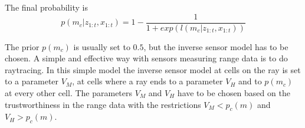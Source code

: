 The final probability is 
\begin{equation} \label{eq4_6}
  p(m_c|z_{1:t},x_{1:t}) = 1-\frac{1}{1+exp(l(m_c|z_{1:t},x_{1:t}))}
\end{equation}

The prior $p(m_c)$ is usually set to $0.5$, but the inverse sensor model has to be chosen. A simple and effective way with sensors measuring range data is to do raytracing. In this simple model the inverse sensor model at cells on the ray is set to a parameter $V_M$, at cells where a ray ends to a parameter $V_H$ and to $p(m_c)$ at every other cell. The parameters $V_M$ and $V_H$ have to be chosen based on the trustworthiness in the range data with the restrictions $V_M < p_c(m)$ and $V_H > p_{c}(m)$.

